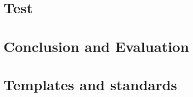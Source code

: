 \documentclass[11pt, a4paper]{article}
\begin{document}
\newpage
\section{Test}

\newpage

\newpage

\newpage

\newpage


\newpage
\section{Conclusion and Evaluation}




\newpage
\section{Templates and standards}


\end{document}
